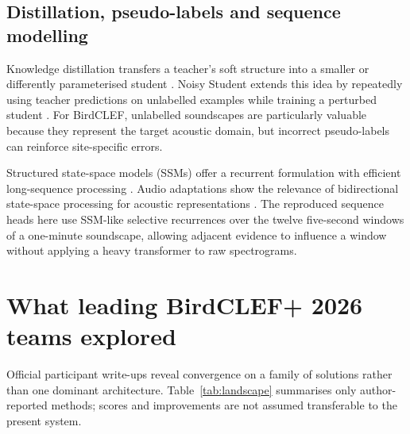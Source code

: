 \documentclass[10pt,a4paper]{article}
\begin{document}
\subsection{Distillation, pseudo-labels and sequence modelling}
Knowledge distillation transfers a teacher's soft structure into a smaller or differently parameterised student \cite{hinton2015distilling}. Noisy Student extends this idea by repeatedly using teacher predictions on unlabelled examples while training a perturbed student \cite{xie2020noisystudent}. For BirdCLEF, unlabelled soundscapes are particularly valuable because they represent the target acoustic domain, but incorrect pseudo-labels can reinforce site-specific errors.

Structured state-space models (SSMs) offer a recurrent formulation with efficient long-sequence processing \cite{gu2021s4}. Audio adaptations show the relevance of bidirectional state-space processing for acoustic representations \cite{zhang2024audiomamba}. The reproduced sequence heads here use SSM-like selective recurrences over the twelve five-second windows of a one-minute soundscape, allowing adjacent evidence to influence a window without applying a heavy transformer to raw spectrograms.

\section{What leading BirdCLEF+ 2026 teams explored}
Official participant write-ups reveal convergence on a family of solutions rather than one dominant architecture. Table~\ref{tab:landscape} summarises only author-reported methods; scores and improvements are not assumed transferable to the present system.
\end{document}
